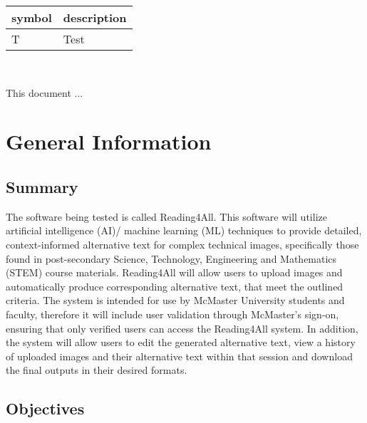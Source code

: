 \documentclass[12pt, titlepage]{article}
\begin{document}
\renewcommand{\arraystretch}{1.2}
\begin{tabular}{l l} 
  \toprule		
  \textbf{symbol} & \textbf{description}\\
  \midrule 
  T & Test\\
  \bottomrule
\end{tabular}\\



\newpage


This document ... 

\section{General Information}

\subsection{Summary}


The software being tested is called Reading4All. This software will utilize artificial intelligence (AI)/
machine learning (ML) techniques to provide detailed, context-informed alternative text for complex technical images, specifically those found in post-secondary Science, Technology, Engineering and Mathematics (STEM)
course materials. Reading4All will allow users to upload images and automatically produce corresponding alternative text, that meet the outlined criteria. The system is intended for use by McMaster University students and faculty, therefore it will include user validation through McMaster's sign-on, ensuring that only verified users can access the Reading4All system.  
In addition, the system will allow users to edit the generated alternative text, view a history of uploaded images and their alternative text within that session and download the final outputs in their desired formats.


\subsection{Objectives}
\end{document}
